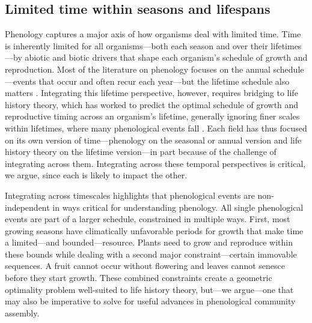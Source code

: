\documentclass[11pt]{article}
\begin{document}
\subsection*{Limited time within seasons and lifespans} %

Phenology captures a major axis of how organisms deal with limited time. Time is inherently limited for all organisms---both each season and over their lifetimes---by abiotic and biotic drivers that shape each organism's schedule of growth and reproduction. Most of the literature on phenology focuses on the annual schedule---events that occur and often recur each year---but the lifetime schedule also matters \citep{post2008phenological,park2022seasonal}. Integrating this lifetime perspective, however, requires bridging to life history theory, which has worked to predict the optimal schedule of growth and reproductive timing across an organism's lifetime, generally ignoring finer scales within lifetimes, where many phenological events fall \citep[but see][]{bazzaz1987allocating,ejsmond2010time}. Each field has thus focused on its own version of time---phenology on the seasonal or annual version and life history theory on the lifetime version---in part because of the challenge of integrating across them. Integrating across these temporal perspectives is critical, we argue, since each is likely to impact the other. %

Integrating across timescales highlights that phenological events are non-independent in ways critical for understanding phenology. All single phenological events are part of a larger schedule, constrained in multiple ways. First, most growing seasons have climatically unfavorable periods for growth that make time a limited---and bounded---resource. Plants need to grow and reproduce within these bounds while dealing with a second major constraint---certain immovable sequences. A fruit cannot occur without flowering and leaves cannot senesce before they start growth. These combined constraints create a geometric optimality problem well-suited to life history theory, but---we argue---one that may also be imperative to solve for useful advances in phenological community assembly.
\end{document}
